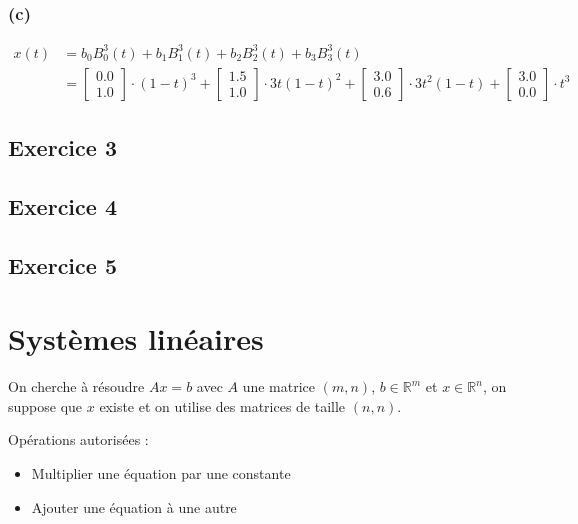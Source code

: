 \documentclass[a4paper,9pt]{extarticle}
\newcommand{\matv}[2]{\begin{bmatrix}#1 \\ #2 \end{bmatrix}}
\begin{document}
\subsection*{(c)}
\begin{align*}
x(t) &= b_0B^3_0(t) + b_1B^3_1(t) + b_2B^3_2(t) + b_3B^3_3(t) \\
     &= \matv{0.0}{1.0} \cdot (1-t)^3 + \matv{1.5}{1.0} \cdot 3t(1-t)^2 + \matv{3.0}{0.6} \cdot 3t^2(1-t) + \matv{3.0}{0.0} \cdot t^3
\end{align*}

\section{Exercice 3}
\section{Exercice 4}
\section{Exercice 5}


\chapter{Systèmes linéaires}
On cherche à résoudre $Ax=b$ avec $A$ une matrice $(m,n)$, $b\in \mathbb{R}^m$ et $x\in \mathbb{R}^n$, on suppose que $x$ existe et on utilise des matrices de taille $(n,n)$.

Opérations autorisées :
\begin{itemize}
    \item Multiplier une équation par une constante
    \item Ajouter une équation à une autre
\end{itemize}
\end{document}
